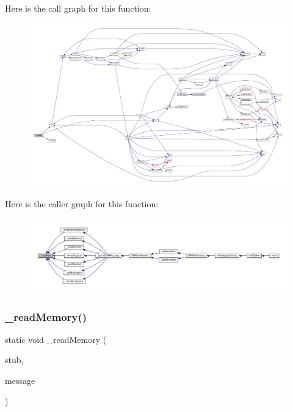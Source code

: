 Here is the call graph for this function\+:
\nopagebreak
\begin{figure}[H]
\begin{center}
\leavevmode
\includegraphics[width=350pt]{gdb-stub_8c_a480f57f311cfc4a8cd9182b20ca8addc_cgraph}
\end{center}
\end{figure}
Here is the caller graph for this function\+:
\nopagebreak
\begin{figure}[H]
\begin{center}
\leavevmode
\includegraphics[width=350pt]{gdb-stub_8c_a480f57f311cfc4a8cd9182b20ca8addc_icgraph}
\end{center}
\end{figure}
\mbox{\label{gdb-stub_8c_aaf71acf340ddecdd40415bcd393b31cb}} 
\subsubsection{\texorpdfstring{\+\_\+read\+Memory()}{\_readMemory()}}
{\footnotesize\ttfamily static void \+\_\+read\+Memory (\begin{DoxyParamCaption}\item[{struct G\+D\+B\+Stub $\ast$}]{stub,  }\item[{const char $\ast$}]{message }\end{DoxyParamCaption})\hspace{0.3cm}{\ttfamily [static]}}

